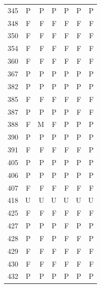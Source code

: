 \begin{table}[!htbp]
\begin{tabular*}{\textwidth}{@{\extracolsep{\fill}}rrrrrrr}
345 & P & P & P & P & P & P\\
348 & F & F & F & F & F & F\\
350 & F & F & F & F & F & F\\
354 & F & F & F & F & F & F\\
360 & F & F & F & F & F & F\\
367 & P & P & P & P & P & P\\
382 & P & P & P & P & P & P\\
385 & F & F & F & F & F & F\\
387 & P & P & P & P & F & F\\
388 & F & M & F & P & P & P\\
390 & P & P & P & P & P & P\\
391 & F & F & F & F & F & P\\
405 & P & P & P & P & P & P\\
406 & P & P & P & P & P & P\\
407 & F & F & F & F & F & F\\
418 & U & U & U & U & U & U\\
425 & F & F & F & F & F & F\\
427 & P & P & P & F & P & P\\
428 & P & F & P & F & F & P\\
429 & F & F & F & F & F & F\\
430 & F & F & F & F & F & F\\
432 & P & P & P & P & P & P\\
\bottomrule\end{tabular*}\end{table}
\clearpage
